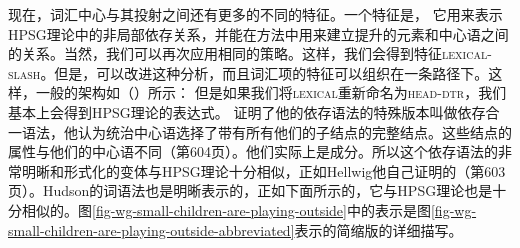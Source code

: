 %
现在，词汇中心与其投射之间还有更多的不同的特征。一个特征是\slaschc， 它用来表示HPSG理论中的非局部依存关系，并能在\citet{GO2009a}方法中用来建立提升的元素和中心语之间的关系。当然，我们可以再次应用相同的策略。这样，我们会得到特征\textsc{lexical-slash}。但是，可以改进这种分析，而且词汇项的特征可以组织在一条路径下。这样，一般的架构如（）所示：
\ea
{}
\z
但是如果我们将\textsc{lexical}重新命名为\textsc{head-dtr}，我们基本上会得到HPSG理论的表达式。
%
\citet[]{Hellwig2003a}证明了他的依存语法的特殊版本叫做依存合一语法，他认为统治中心语选择了带有所有他们的子结点的完整结点。这些结点的属性与他们的中心语不同（第604页）。他们实际上是成分。所以这个依存语法的非常明晰和形式化的变体与HPSG理论十分相似，正如Hellwig他自己证明的（第603页）。Hudson的词语法也是明晰表示的，正如下面所示的，它与HPSG理论也是十分相似的。图\vref{fig-wg-small-children-are-playing-outside}中的表示是图\vref{fig-wg-small-children-are-playing-outside-abbreviated}表示的简缩版的详细描写。
%
